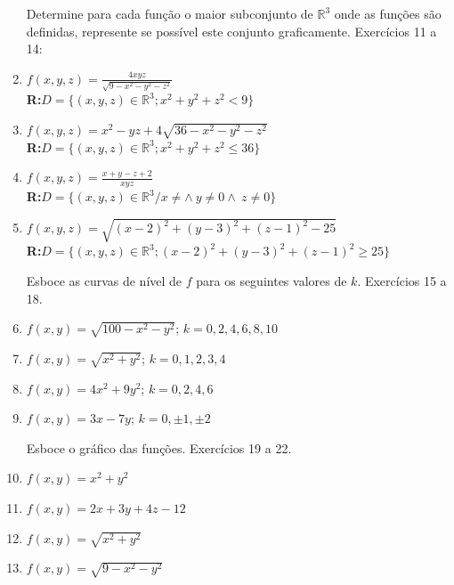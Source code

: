 \documentclass[oneside,a4paper,12pt]{article}
\begin{document}
\begin{enumerate}
    Determine para cada função o maior subconjunto de $\mathbb{R}^3$ onde as funções são definidas, represente se possível este conjunto graficamente. Exercícios 11 a 14:
            \item $f(x,y,z) = \displaystyle\frac{4xyz}{\sqrt{9-x^2-y^2-z^2}}$\\{\bf R:}$D=\{(x,y,z)\in\mathbb{R}^3;x^2+y^2+z^2<9\}$
            \item $f(x,y,z) = x^2-yz+4\sqrt{36-x^2-y^2-z^2}$\\{\bf R:}$D=\{(x,y,z)\in\mathbb{R}^3;x^2+y^2+z^2\leq36\}$
            \item $f(x,y,z) = \displaystyle\frac{x+y-z+2}{xyz}$\\{\bf R:}$D=\{(x,y,z)\in\mathbb{R}^3/x\neq\land~ y\neq0\land~ z\neq0\}$
            \item $f(x,y,z) = \sqrt{(x-2)^2+(y-3)^2+(z-1)^2-25}$\\{\bf R:}$D=\{(x,y,z)\in\mathbb{R}^3;(x-2)^2+(y-3)^2+(z-1)^2\geq25\}$
   
   Esboce as curvas de nível de $f$ para os seguintes valores de $k$. Exercícios 15 a 18.
            \item $f(x,y) = \sqrt{100-x^2-y^2}$; $k=0,2,4,6,8,10$
            \item $f(x,y) = \sqrt{x^2+y^2}$; $k=0,1,2,3,4$
            \item $f(x,y) = 4x^2+9y^2$; $k=0,2,4,6$
            \item $f(x,y) = 3x-7y$; $k=0,\pm1,\pm2$
	
	Esboce o gráfico das funções. Exercícios 19 a 22.
            \item $f(x,y) = x^2+y^2$
            \item $f(x,y) = 2x+3y+4z-12$
            \item $f(x,y) = \sqrt{x^2+y^2}$
            \item $f(x,y) = \sqrt{9-x^2-y^2}$
    


\end{enumerate}
\end{document}
